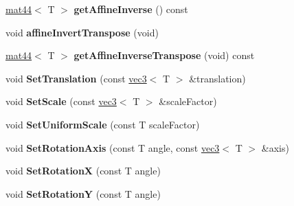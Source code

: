 \begin{DoxyCompactItemize}
\item 
\hypertarget{classmath_1_1mat44_a09248f74f03a4f958fcb2eb2d9248d5c}{
\hyperlink{classmath_1_1mat44}{mat44}$<$ T $>$ {\bfseries getAffineInverse} () const }
\label{classmath_1_1mat44_a09248f74f03a4f958fcb2eb2d9248d5c}

\item 
\hypertarget{classmath_1_1mat44_a072fc6e2765647db343c50dd43d9adc7}{
void {\bfseries affineInvertTranspose} (void)}
\label{classmath_1_1mat44_a072fc6e2765647db343c50dd43d9adc7}

\item 
\hypertarget{classmath_1_1mat44_a82657344cf63e2449ff593540308dbdb}{
\hyperlink{classmath_1_1mat44}{mat44}$<$ T $>$ {\bfseries getAffineInverseTranspose} (void) const }
\label{classmath_1_1mat44_a82657344cf63e2449ff593540308dbdb}

\item 
\hypertarget{classmath_1_1mat44_a7bdd641b2350683a0860333f9323d1dc}{
void {\bfseries SetTranslation} (const \hyperlink{classmath_1_1vec3}{vec3}$<$ T $>$ \&translation)}
\label{classmath_1_1mat44_a7bdd641b2350683a0860333f9323d1dc}

\item 
\hypertarget{classmath_1_1mat44_ab97cc4f94a1fa7824ae4127037a404d4}{
void {\bfseries SetScale} (const \hyperlink{classmath_1_1vec3}{vec3}$<$ T $>$ \&scaleFactor)}
\label{classmath_1_1mat44_ab97cc4f94a1fa7824ae4127037a404d4}

\item 
\hypertarget{classmath_1_1mat44_a6a0d5ddb6df2dc6568f0d6a95f302d3b}{
void {\bfseries SetUniformScale} (const T scaleFactor)}
\label{classmath_1_1mat44_a6a0d5ddb6df2dc6568f0d6a95f302d3b}

\item 
\hypertarget{classmath_1_1mat44_abd4331ba43db126428b868fe4d8fe259}{
void {\bfseries SetRotationAxis} (const T angle, const \hyperlink{classmath_1_1vec3}{vec3}$<$ T $>$ \&axis)}
\label{classmath_1_1mat44_abd4331ba43db126428b868fe4d8fe259}

\item 
\hypertarget{classmath_1_1mat44_a8a3e080f62685e9df01d1fb07249d11d}{
void {\bfseries SetRotationX} (const T angle)}
\label{classmath_1_1mat44_a8a3e080f62685e9df01d1fb07249d11d}

\item 
\hypertarget{classmath_1_1mat44_a55e437444524b0a3d2273ca5987d59be}{
void {\bfseries SetRotationY} (const T angle)}
\label{classmath_1_1mat44_a55e437444524b0a3d2273ca5987d59be}


\end{DoxyCompactItemize}
